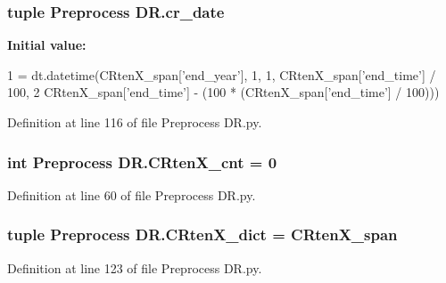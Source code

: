 \hypertarget{namespace_preprocess_01_d_r_a5924b2b745d8569255d35551891b9b4f}{}
\subsubsection[{cr\+\_\+date}]{\setlength{\rightskip}{0pt plus 5cm}tuple Preprocess D\+R.\+cr\+\_\+date}\label{namespace_preprocess_01_d_r_a5924b2b745d8569255d35551891b9b4f}
{\bfseries Initial value\+:}
\begin{DoxyCode}
1 = dt.datetime(CRtenX\_span[\textcolor{stringliteral}{'end\_year'}], 1, 1, CRtenX\_span[\textcolor{stringliteral}{'end\_time'}] / 100,
2                                       CRtenX\_span[\textcolor{stringliteral}{'end\_time'}] - (100 * (CRtenX\_span[\textcolor{stringliteral}{'end\_time'}] / 100)))
\end{DoxyCode}


Definition at line 116 of file Preprocess D\+R.\+py.

\hypertarget{namespace_preprocess_01_d_r_a50b6ef7f8682b5031dc5857112fcab2d}{}
\subsubsection[{C\+Rten\+X\+\_\+cnt}]{\setlength{\rightskip}{0pt plus 5cm}int Preprocess D\+R.\+C\+Rten\+X\+\_\+cnt = 0}\label{namespace_preprocess_01_d_r_a50b6ef7f8682b5031dc5857112fcab2d}


Definition at line 60 of file Preprocess D\+R.\+py.

\hypertarget{namespace_preprocess_01_d_r_a1f133b54c3941799c8821d6d7b6a5d9c}{}
\subsubsection[{C\+Rten\+X\+\_\+dict}]{\setlength{\rightskip}{0pt plus 5cm}tuple Preprocess D\+R.\+C\+Rten\+X\+\_\+dict = {\bf C\+Rten\+X\+\_\+span}}\label{namespace_preprocess_01_d_r_a1f133b54c3941799c8821d6d7b6a5d9c}


Definition at line 123 of file Preprocess D\+R.\+py.

